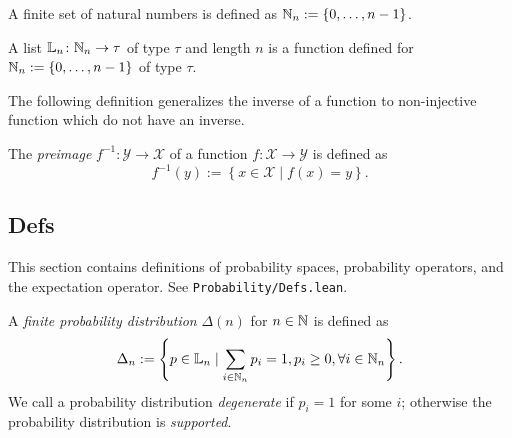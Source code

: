 \begin{definition}
A finite set of natural numbers is defined as $\mathbb{N}_n := \left\{ 0, \dots , n-1   \right\}$.
\end{definition}

\begin{definition}
A list $\mathbb{L}_n \colon \mathbb{N}_n \to \tau$ of type $\tau$ and length $n$ is a function defined for $\mathbb{N}_{n} := \left\{ 0, \dots , n-1 \right\}$ of type $\tau$.
\end{definition}

The following definition generalizes the inverse of a function to non-injective function which do not have an inverse. 
\begin{definition}[Preimage]
The \emph{preimage} $f^{-1}\colon \mathcal{Y} \to \mathcal{X}$ of a function $f\colon \mathcal{X} \to \mathcal{Y}$ is defined as
\begin{equation} \label{eq:preimage-set}
f^{-1}(y) := \left\{ x \in \mathcal{X} \mid  f(x) = y \right\} .
\end{equation}
\end{definition}

\subsection{Defs}

This section contains definitions of probability spaces, probability operators, and the expectation operator. See \texttt{Probability/Defs.lean}.
\begin{definition}
A \emph{finite probability distribution} $\Delta(n)$ for $n\in \mathbb{N}$ is defined as
\[
\Delta_n := \left\{ p \in \mathbb{L}_n \mid  \sum_{i \in \mathbb{N}_n} p_i = 1, p_i \ge 0, \forall i \in \mathbb{N}_n \right\}.
\]
We call a probability distribution \emph{degenerate} if $p_i = 1$ for some $i$; otherwise the probability distribution is \emph{supported}.
\end{definition}

